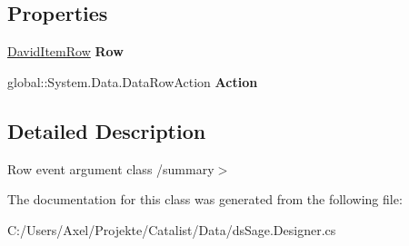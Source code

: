 \subsection*{Properties}
\begin{DoxyCompactItemize}
\item 
\hyperlink{class_products_1_1_data_1_1ds_sage_1_1_david_item_row}{David\+Item\+Row} {\bfseries Row}\hypertarget{class_products_1_1_data_1_1ds_sage_1_1_david_item_row_change_event_abc66b887d2e9c1c42bf4053922a0c114}{}\label{class_products_1_1_data_1_1ds_sage_1_1_david_item_row_change_event_abc66b887d2e9c1c42bf4053922a0c114}

\item 
global\+::\+System.\+Data.\+Data\+Row\+Action {\bfseries Action}\hypertarget{class_products_1_1_data_1_1ds_sage_1_1_david_item_row_change_event_a01aad23944ee1f38369a49a6a4175406}{}\label{class_products_1_1_data_1_1ds_sage_1_1_david_item_row_change_event_a01aad23944ee1f38369a49a6a4175406}

\end{DoxyCompactItemize}


\subsection{Detailed Description}
Row event argument class /summary$>$ 

The documentation for this class was generated from the following file\+:\begin{DoxyCompactItemize}
\item 
C\+:/\+Users/\+Axel/\+Projekte/\+Catalist/\+Data/ds\+Sage.\+Designer.\+cs\end{DoxyCompactItemize}
